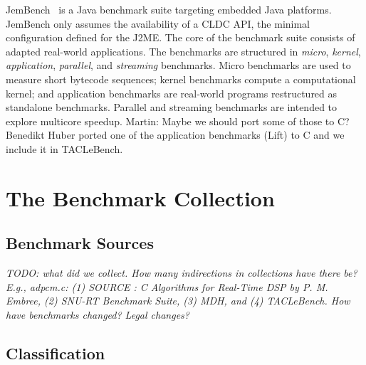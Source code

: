 \documentclass[a4paper,UKenglish]{oasics}
\newcommand{\todo}[1]{{\emph{TODO: #1}}}
\newcommand{\martin}[1]{{\color{blue} Martin: #1}}
\begin{document}
JemBench~\cite{jembench} is a Java benchmark suite targeting
embedded Java platforms. JemBench only assumes the
availability of a CLDC API, the minimal configuration
defined for the J2ME. The core of the benchmark suite consists of
adapted real-world applications.
The benchmarks are structured in {\em micro}, {\em kernel}, {\em
application}, {\em parallel}, and {\em streaming} benchmarks.
Micro benchmarks are used to measure short bytecode sequences;
kernel benchmarks compute a computational kernel; and application
benchmarks are real-world programs restructured as standalone benchmarks.
Parallel and streaming benchmarks are intended to explore multicore
speedup.
\martin{Maybe we should port some of those to C?}
Benedikt Huber ported one of the application benchmarks (Lift) to C
and we include it in TACLeBench.




\section{The Benchmark Collection}
\label{sec:collect}


\subsection{Benchmark Sources}

\todo{what did we collect. How many indirections in collections have there be?
E.g., adpcm.c: (1) SOURCE : C Algorithms for Real-Time DSP by P. M. Embree,
(2) SNU-RT Benchmark Suite, (3) MDH, and (4) TACLeBench. How have
benchmarks  changed? Legal changes?}

\subsection{Classification}
\end{document}
